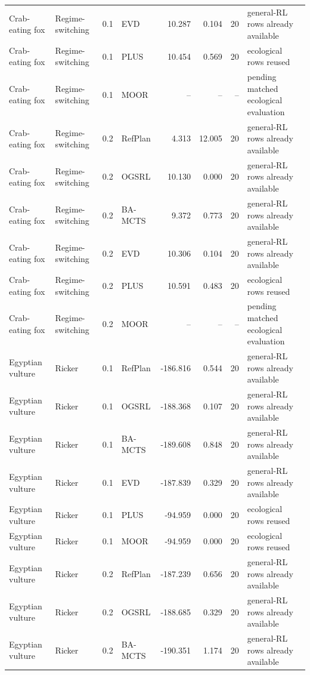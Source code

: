 \documentclass[10pt]{article}
\begin{document}
\begin{landscape}
\begin{center}
\begin{longtable}{@{}llclr rrp{5.2cm}@{}}
Crab-eating fox & Regime-switching & 0.1 & EVD & 10.287 & 0.104 & 20 & general-RL rows already available \\
Crab-eating fox & Regime-switching & 0.1 & PLUS & 10.454 & 0.569 & 20 & ecological rows reused \\
Crab-eating fox & Regime-switching & 0.1 & MOOR & -- & -- & -- & pending matched ecological evaluation \\
\addlinespace[1.5pt]
Crab-eating fox & Regime-switching & 0.2 & RefPlan & 4.313 & 12.005 & 20 & general-RL rows already available \\
Crab-eating fox & Regime-switching & 0.2 & OGSRL & 10.130 & 0.000 & 20 & general-RL rows already available \\
Crab-eating fox & Regime-switching & 0.2 & BA-MCTS & 9.372 & 0.773 & 20 & general-RL rows already available \\
Crab-eating fox & Regime-switching & 0.2 & EVD & 10.306 & 0.104 & 20 & general-RL rows already available \\
Crab-eating fox & Regime-switching & 0.2 & PLUS & 10.591 & 0.483 & 20 & ecological rows reused \\
Crab-eating fox & Regime-switching & 0.2 & MOOR & -- & -- & -- & pending matched ecological evaluation \\
\addlinespace[1.5pt]
Egyptian vulture & Ricker & 0.1 & RefPlan & -186.816 & 0.544 & 20 & general-RL rows already available \\
Egyptian vulture & Ricker & 0.1 & OGSRL & -188.368 & 0.107 & 20 & general-RL rows already available \\
Egyptian vulture & Ricker & 0.1 & BA-MCTS & -189.608 & 0.848 & 20 & general-RL rows already available \\
Egyptian vulture & Ricker & 0.1 & EVD & -187.839 & 0.329 & 20 & general-RL rows already available \\
Egyptian vulture & Ricker & 0.1 & PLUS & -94.959 & 0.000 & 20 & ecological rows reused \\
Egyptian vulture & Ricker & 0.1 & MOOR & -94.959 & 0.000 & 20 & ecological rows reused \\
\addlinespace[1.5pt]
Egyptian vulture & Ricker & 0.2 & RefPlan & -187.239 & 0.656 & 20 & general-RL rows already available \\
Egyptian vulture & Ricker & 0.2 & OGSRL & -188.685 & 0.329 & 20 & general-RL rows already available \\
Egyptian vulture & Ricker & 0.2 & BA-MCTS & -190.351 & 1.174 & 20 & general-RL rows already available \\

\end{longtable}
\end{center}
\end{landscape}
\end{document}
